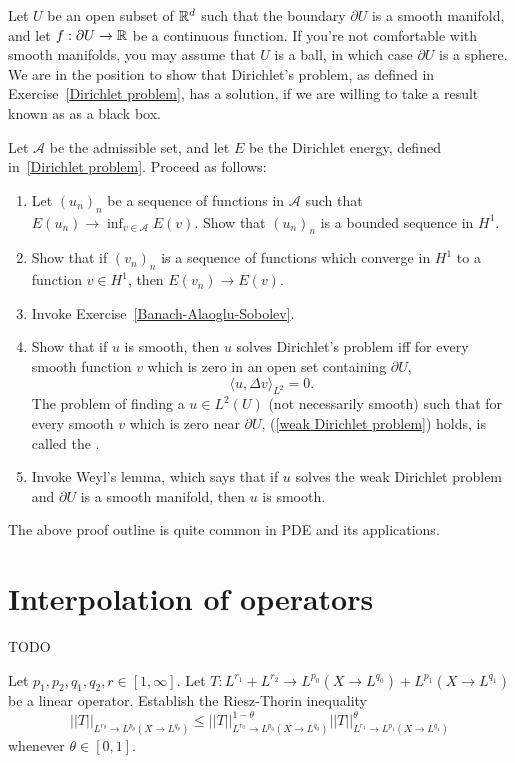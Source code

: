 \begin{exercise}
\label{Dirichlet problem 2}
Let $U$ be an open subset of $\mathbb{R}^d$ such that the boundary $\partial U$ is a smooth manifold, and let $f: \partial U \to \mathbb{R}$ be a continuous function.
If you're not comfortable with smooth manifolds, you may assume that $U$ is a ball, in which case $\partial U$ is a sphere.
We are in the position to show that Dirichlet's problem, as defined in Exercise~\ref{Dirichlet problem}, has a solution, if we are willing to take a result known as  as a black box.

Let $\mathcal A$ be the admissible set, and let $E$ be the Dirichlet energy, defined in~\ref{Dirichlet problem}.
Proceed as follows:
\begin{enumerate}
\item Let $(u_{n})_{n}$ be a sequence of functions in $\mathcal A$ such that $E(u_{n}) \to \inf_{v \in \mathcal A} E(v)$.
Show that $(u_{n})_{n}$ is a bounded sequence in $H^1$.
\item Show that if $(v_{n})_{n}$ is a sequence of functions which converge in $H^1$ to a function $v \in H^1$, then $E(v_{n}) \to E(v)$.
\item Invoke Exercise~\ref{Banach-Alaoglu-Sobolev}.
\item Show that if $u$ is smooth, then $u$ solves Dirichlet's problem iff for every smooth function $v$ which is zero in an open set containing $\partial U$,
\begin{equation}
\label{weak Dirichlet problem}
\langle u, \Delta v\rangle_{L^2} = 0.
\end{equation}
The problem of finding a $u \in L^2(U)$ (not necessarily smooth) such that for every smooth $v$ which is zero near $\partial U$, (\ref{weak Dirichlet problem}) holds, is called the .
\item Invoke Weyl's lemma, which says that if $u$ solves the weak Dirichlet problem and $\partial U$ is a smooth manifold, then $u$ is smooth.
\end{enumerate}
The above proof outline is quite common in PDE and its applications.
\end{exercise}


\section{Interpolation of operators}
TODO

\begin{exercise}
Let $p_1,p_2,q_1,q_2,r \in [1, \infty]$. Let $T: L^{r_1} + L^{r_2} \to L^{p_0}(X \to L^{q_0}) + L^{p_1}(X \to L^{q_1})$ be a linear operator.
Establish the Riesz-Thorin inequality
\[||T||_{L^{r_\theta} \to L^{p_\theta}(X \to L^{q_\theta})} \leq ||T||_{L^{r_0} \to L^{p_0}(X \to L^{q_0})}^{1 - \theta} ||T||_{L^{r_1} \to L^{p_1}(X \to L^{q_1})}^\theta\]
whenever $\theta \in [0, 1]$.
\end{exercise}

